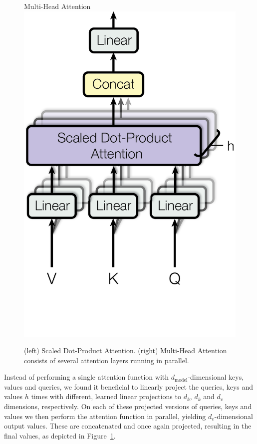\documentclass{article}
\newcommand{\dmodel}{d_{\text{model}}}
\begin{document}
\begin{figure}
\begin{minipage}[t]{0.5\textwidth}
\end{minipage}
\begin{minipage}[t]{0.5\textwidth}
  \centering 
  Multi-Head Attention \\
  \vspace{0.1cm}
  \includegraphics[scale=0.6]{Figures/ModalNet-20}  
\end{minipage}




  \caption{(left) Scaled Dot-Product Attention. (right) Multi-Head Attention consists of several attention layers running in parallel.}
  \label{fig:multi-head-att}
\end{figure}

Instead of performing a single attention function with $\dmodel$-dimensional keys, values and queries, we found it beneficial to linearly project the queries, keys and values $h$ times with different, learned linear projections to $d_k$, $d_k$ and $d_v$ dimensions, respectively.
On each of these projected versions of queries, keys and values we then perform the attention function in parallel, yielding $d_v$-dimensional output values. These are concatenated and once again projected, resulting in the final values, as depicted in Figure~\ref{fig:multi-head-att}.
\end{document}
